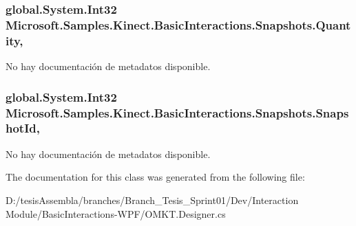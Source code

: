 \hypertarget{class_microsoft_1_1_samples_1_1_kinect_1_1_basic_interactions_1_1_snapshots_aec5d2c578d98d9e8a2e0d2c73298c416}{
\subsubsection[{Quantity}]{\setlength{\rightskip}{0pt plus 5cm}global.\-System.\-Int32 Microsoft.\-Samples.\-Kinect.\-Basic\-Interactions.\-Snapshots.\-Quantity\hspace{0.3cm}{\ttfamily [get]}, {\ttfamily [set]}}}\label{class_microsoft_1_1_samples_1_1_kinect_1_1_basic_interactions_1_1_snapshots_aec5d2c578d98d9e8a2e0d2c73298c416}


No hay documentación de metadatos disponible. 

\hypertarget{class_microsoft_1_1_samples_1_1_kinect_1_1_basic_interactions_1_1_snapshots_a38e656a5d81702b34a246c5439e5cd59}{
\subsubsection[{Snapshot\-Id}]{\setlength{\rightskip}{0pt plus 5cm}global.\-System.\-Int32 Microsoft.\-Samples.\-Kinect.\-Basic\-Interactions.\-Snapshots.\-Snapshot\-Id\hspace{0.3cm}{\ttfamily [get]}, {\ttfamily [set]}}}\label{class_microsoft_1_1_samples_1_1_kinect_1_1_basic_interactions_1_1_snapshots_a38e656a5d81702b34a246c5439e5cd59}


No hay documentación de metadatos disponible. 



The documentation for this class was generated from the following file\-:\begin{DoxyCompactItemize}
\item 
D\-:/tesis\-Assembla/branches/\-Branch\-\_\-\-Tesis\-\_\-\-Sprint01/\-Dev/\-Interaction Module/\-Basic\-Interactions-\/\-W\-P\-F/O\-M\-K\-T.\-Designer.\-cs\end{DoxyCompactItemize}
